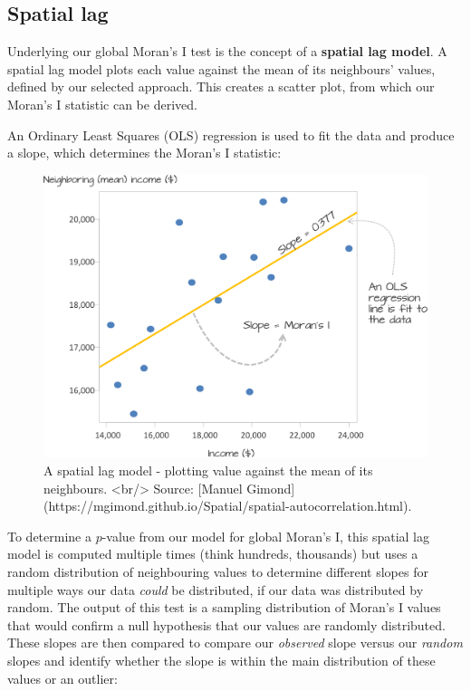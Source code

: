 \documentclass[
]{book}
\begin{document}
\hypertarget{spatial-lag}{%
\subsection{Spatial lag}\label{spatial-lag}}

Underlying our global Moran's I test is the concept of a \textbf{spatial lag model}. A spatial lag model plots each value against the mean of its neighbours' values, defined by our selected approach. This creates a scatter plot, from which our Moran's I statistic can be derived.

An Ordinary Least Squares (OLS) regression is used to fit the data and produce a slope, which determines the Moran's I statistic:

\begin{figure}

{\centering \includegraphics[width=34.04in]{images/w07/MoranI_scatter_plot} 

}

\caption{A spatial lag model - plotting value against the mean of its neighbours. <br/> Source: [Manuel Gimond](https://mgimond.github.io/Spatial/spatial-autocorrelation.html).}\label{fig:07-moran-plt}
\end{figure}

To determine a \(p\)-value from our model for global Moran's I, this spatial lag model is computed multiple times (think hundreds, thousands) but uses a random distribution of neighbouring values to determine different slopes for multiple ways our data \emph{could} be distributed, if our data was distributed by random. The output of this test is a sampling distribution of Moran's I values that would confirm a null hypothesis that our values are randomly distributed. These slopes are then compared to compare our \emph{observed} slope versus our \emph{random} slopes and identify whether the slope is within the main distribution of these values or an outlier:
\end{document}
